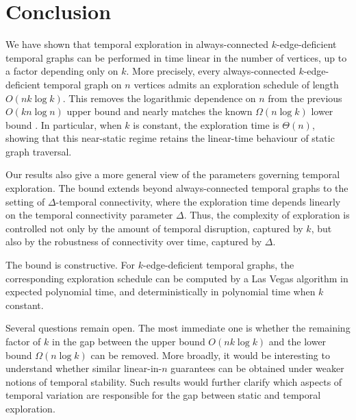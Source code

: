 \documentclass[a4paper,11pt]{article}
\theoremstyle{definition}
\theoremstyle{remark}
\begin{document}
    \section{Conclusion}
    
    We have shown that temporal exploration in always-connected $k$-edge-deficient temporal graphs can be
    performed in time linear in the number of vertices, up to a factor depending only on $k$.
    More precisely, every always-connected $k$-edge-deficient temporal graph on $n$ vertices
    admits an exploration schedule of length $O(nk\log k)$. This removes the logarithmic
    dependence on $n$ from the previous $O(kn\log n)$ upper bound and nearly matches the
    known $\Omega(n\log k)$ lower bound \cite{ES22}. In particular, when $k$ is constant, the exploration
    time is $\Theta(n)$, showing that this near-static regime retains the linear-time behaviour
    of static graph traversal.
    
    Our results also give a more general view of the parameters governing temporal exploration.
    The bound extends beyond always-connected temporal graphs to the setting of
    $\Delta$-temporal connectivity, where the exploration time depends linearly on the temporal
    connectivity parameter $\Delta$. Thus, the complexity of exploration is controlled not only
    by the amount of temporal disruption, captured by $k$, but also by the robustness of
    connectivity over time, captured by $\Delta$.
    
    The bound is constructive. For $k$-edge-deficient temporal graphs, the corresponding exploration schedule can be computed by a Las Vegas algorithm in expected polynomial time, and deterministically in polynomial time when  $k$ constant.
    
    Several questions remain open. The most immediate one is whether the remaining factor of
    $k$ in the gap between the upper bound $O(nk\log k)$ and the lower bound
    $\Omega(n\log k)$ can be removed. More broadly, it would be interesting to understand
    whether similar linear-in-$n$ guarantees can be obtained under weaker notions of temporal
    stability. Such results would further clarify which aspects of temporal variation are
    responsible for the gap between static and temporal exploration.

    
	
    
\end{document}
